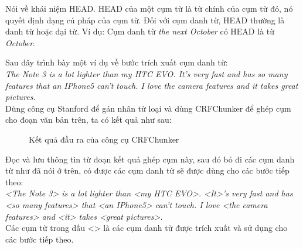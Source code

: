 \documentclass[12pt]{report}
\begin{document}
			\par Nói về khái niệm HEAD. HEAD của một cụm từ là từ chính của cụm từ đó, nó quyết định dạng cú pháp của cụm từ. Đối với cụm danh từ, HEAD thường là danh từ hoặc đại từ. Ví dụ: Cụm danh từ \textit{the next October} có HEAD là từ \textit{October}.
			\par Sau đây trình bày một ví dụ về bước trích xuất cụm danh từ:
				\\\textit{The Note 3 is a lot lighter than my HTC EVO. It's very fast and has so many features that an IPhone5 can't touch. I love the camera features and it takes great pictures.}
				\\Dùng công cụ Stanford để gán nhãn từ loại và dùng CRFChunker để ghép cụm cho đoạn văn bản trên, ta có kết quả như sau:

				\begin{figure}[H]
					\centering				
					\noindent{}
					\caption{Kết quả đầu ra của công cụ CRFChunker}
				\end{figure}

				\par Đọc và lưu thông tin từ đoạn kết quả ghép cụm này, sau đó bỏ đi các cụm danh từ như đã nói ở trên, có được các cụm danh từ sẽ được dùng cho các bước tiếp theo:\\
				\textit{<The Note 3> is a lot lighter than <my HTC EVO>. <It>'s very fast and has <so many features> that <an IPhone5> can't touch. I love <the camera features> and <it> takes <great pictures>.}
				\\Các cụm từ trong dấu <> là các cụm danh từ được trích xuất và sử dụng cho các bước tiếp theo.
\end{document}
